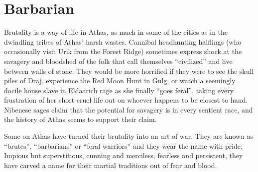 \section{Barbarian}


Brutality is a way of life in Athas, as much in some of the cities as in the dwindling tribes of Athas' harsh wastes. Cannibal headhunting halflings (who occasionally visit Urik from the Forest Ridge) sometimes express shock at the savagery and bloodshed of the folk that call themselves ``civilized'' and live between walls of stone. They would be more horrified if they were to see the skull piles of Draj, experience the Red Moon Hunt in Gulg, or watch a seemingly docile house slave in Eldaarich rage as she finally ``goes feral'', taking every frustration of her short cruel life out on whoever happens to be closest to hand. Nibenese sages claim that the potential for savagery is in every sentient race, and the history of Athas seems to support their claim.

Some on Athas have turned their brutality into an art of war. They are known as ``brutes'', ``barbarians'' or ``feral warriors'' and they wear the name with pride. Impious but superstitious, cunning and merciless, fearless and persistent, they have carved a name for their martial traditions out of fear and blood.

